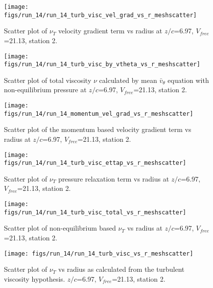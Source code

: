 \begin{figure}[H]
\centering
\texttt{[image: figs/run\_14/run\_14\_turb\_visc\_vel\_grad\_vs\_r\_meshscatter]}
\caption{Scatter plot of $\nu_T$ velocity gradient term vs radius at $z/c$=6.97, $V_{free}$=21.13, station 2.}
\end{figure}


\begin{figure}[H]
\centering
\texttt{[image: figs/run\_14/run\_14\_turb\_visc\_by\_vtheta\_vs\_r\_meshscatter]}
\caption{Scatter plot of total viscosity $\nu$ calculated by mean $\bar{v}_{\theta}$ equation with non-equilibrium pressure at $z/c$=6.97, $V_{free}$=21.13, station 2.}
\end{figure}


\begin{figure}[H]
\centering
\texttt{[image: figs/run\_14/run\_14\_momentum\_vel\_grad\_vs\_r\_meshscatter]}
\caption{Scatter plot of the momentum based velocity gradient term vs radius at $z/c$=6.97, $V_{free}$=21.13, station 2.}
\end{figure}


\begin{figure}[H]
\centering
\texttt{[image: figs/run\_14/run\_14\_turb\_visc\_ettap\_vs\_r\_meshscatter]}
\caption{Scatter plot of $\nu_T$ pressure relaxation term vs radius at $z/c$=6.97, $V_{free}$=21.13, station 2.}
\end{figure}


\begin{figure}[H]
\centering
\texttt{[image: figs/run\_14/run\_14\_turb\_visc\_total\_vs\_r\_meshscatter]}
\caption{Scatter plot of non-equilibrium based $\nu_T$ vs radius at $z/c$=6.97, $V_{free}$=21.13, station 2.}
\end{figure}


\begin{figure}[H]
\centering
\texttt{[image: figs/run\_14/run\_14\_turb\_visc\_vs\_r\_meshscatter]}
\caption{Scatter plot of $\nu_T$ vs radius as calculated from the turbulent viscosity hypothesis. $z/c$=6.97, $V_{free}$=21.13, station 2.}
\end{figure}


